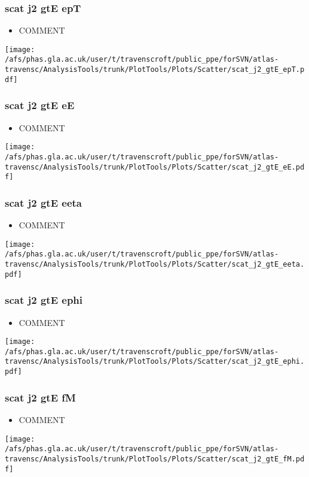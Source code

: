 \documentclass{beamer}
\begin{document}
\begin{frame}
\frametitle{scat j2 gtE epT}
\begin{itemize}
\item COMMENT
\end{itemize}
\begin{center}
\texttt{[image: /afs/phas.gla.ac.uk/user/t/travenscroft/public\_ppe/forSVN/atlas-travensc/AnalysisTools/trunk/PlotTools/Plots/Scatter/scat\_j2\_gtE\_epT.pdf]}
\end{center}
\end{frame}

\begin{frame}
\frametitle{scat j2 gtE eE}
\begin{itemize}
\item COMMENT
\end{itemize}
\begin{center}
\texttt{[image: /afs/phas.gla.ac.uk/user/t/travenscroft/public\_ppe/forSVN/atlas-travensc/AnalysisTools/trunk/PlotTools/Plots/Scatter/scat\_j2\_gtE\_eE.pdf]}
\end{center}
\end{frame}

\begin{frame}
\frametitle{scat j2 gtE eeta}
\begin{itemize}
\item COMMENT
\end{itemize}
\begin{center}
\texttt{[image: /afs/phas.gla.ac.uk/user/t/travenscroft/public\_ppe/forSVN/atlas-travensc/AnalysisTools/trunk/PlotTools/Plots/Scatter/scat\_j2\_gtE\_eeta.pdf]}
\end{center}
\end{frame}

\begin{frame}
\frametitle{scat j2 gtE ephi}
\begin{itemize}
\item COMMENT
\end{itemize}
\begin{center}
\texttt{[image: /afs/phas.gla.ac.uk/user/t/travenscroft/public\_ppe/forSVN/atlas-travensc/AnalysisTools/trunk/PlotTools/Plots/Scatter/scat\_j2\_gtE\_ephi.pdf]}
\end{center}
\end{frame}

\begin{frame}
\frametitle{scat j2 gtE fM}
\begin{itemize}
\item COMMENT
\end{itemize}
\begin{center}
\texttt{[image: /afs/phas.gla.ac.uk/user/t/travenscroft/public\_ppe/forSVN/atlas-travensc/AnalysisTools/trunk/PlotTools/Plots/Scatter/scat\_j2\_gtE\_fM.pdf]}
\end{center}
\end{frame}
\end{document}
